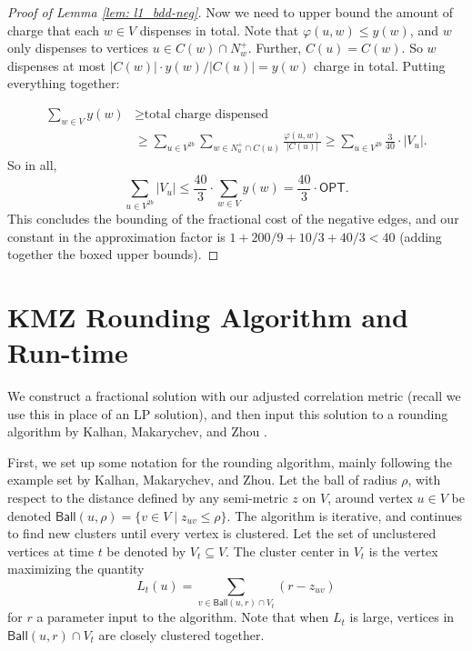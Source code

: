 \documentclass[11pt]{article}
\begin{document}
\begin{proof}[Proof of Lemma \ref{lem: l1_bdd-neg}]
Now we need to upper bound the amount of charge that each $w \in V$ dispenses in total. Note that $\varphi(u,w) \leq y(w)$, and $w$ only dispenses to vertices $u \in C(w) \cap N_w^+$. Further, $C(u) = C(w)$. So $w$ dispenses at most $|C(w)| \cdot y(w)/|C(u)| = y(w)$ charge in total. Putting everything together: 

\begin{align*}
     \sum_{w \in V} y(w) &\geq \text{total charge dispensed} \\
     &\geq \sum_{u \in V^{2b}}  \sum_{w \in N_u^+ \cap C(u)} \frac{\varphi(u,w)}{|C(u)|} 
     \geq \sum_{u \in V^{2b}} \frac{3}{40} \cdot |V_u|.
 \end{align*}
 So in all,
 \[\boxed{\sum_{u \in V^{2b}} |V_u| \leq \frac{40}{3} \cdot \sum_{w \in V} y(w) = \frac{40}{3} \cdot \textsf{OPT}.}\]
This concludes the bounding of the fractional cost of the negative edges, 
and our constant in the approximation factor is $1 + 200/9 + 10/3 + 40/3 < 40$ (adding together the boxed upper bounds). 



\end{proof}

\section{KMZ Rounding Algorithm and Run-time}
\label{sec: lp_rounding_alg}

We construct a fractional solution with our adjusted correlation metric (recall we use this in place of an LP solution), and then
input this solution to a rounding algorithm by Kalhan, Makarychev, and Zhou \citeyearpar{KMZ19}.

First, we set up some notation for the rounding algorithm, 
mainly following the example set by Kalhan, Makarychev, and Zhou.
Let the ball of radius $\rho$, with respect to the distance defined by 
any semi-metric $z$ on $V$, around vertex $u \in V$ 
be denoted $\textsf{Ball}(u,\rho) = \{v \in V \mid z_{uv} \leq \rho\}$.
The algorithm is iterative, and continues to find new clusters until every vertex is clustered.
Let the set of unclustered vertices at time $t$ be denoted by $V_t \subseteq V$.
The cluster center in $V_t$ is the vertex maximizing the quantity
$$
L_t(u)= \sum_{v \in \textsf{Ball}(u,r) \cap V_t} (r-z_{uv})
$$
for $r$ a parameter input to the algorithm.
Note that when $L_t$ is large,
vertices in $\textsf{Ball}(u,r) \cap V_t$ are closely clustered together.\\
\end{document}

